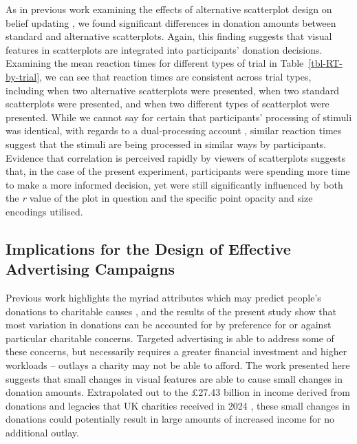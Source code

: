 \documentclass[
  authoryear,
  preprint,
  3p]{elsarticle}
\begin{document}
As in previous work examining the effects of alternative scatterplot
design on belief updating \citep{strain_2025}, we found significant
differences in donation amounts between standard and alternative
scatterplots. Again, this finding suggests that visual features in
scatterplots are integrated into participants' donation decisions.
Examining the mean reaction times for different types of trial in
Table~\ref{tbl-RT-by-trial}, we can see that reaction times are
consistent across trial types, including when two alternative
scatterplots were presented, when two standard scatterplots were
presented, and when two different types of scatterplot were presented.
While we cannot say for certain that participants' processing of stimuli
was identical, with regards to a dual-processing account
\citep{padilla_2018}, similar reaction times suggest that the stimuli
are being processed in similar ways by participants. Evidence that
correlation is perceived rapidly by viewers of scatterplots
\citep{rensink_2014} suggests that, in the case of the present
experiment, participants were spending more time to make a more informed
decision, yet were still significantly influenced by both the \emph{r}
value of the plot in question and the specific point opacity and size
encodings utilised.

\subsection{Implications for the Design of Effective Advertising
Campaigns}\label{implications-for-the-design-of-effective-advertising-campaigns}

Previous work highlights the myriad attributes which may predict
people's donations to charitable causes
\citep{neumayr_2019, bekkers_2011, breeze_2013, berman_2018, macaskill_2019},
and the results of the present study show that most variation in
donations can be accounted for by preference for or against particular
charitable concerns. Targeted advertising \citep{iyer_2005} is able to
address some of these concerns, but necessarily requires a greater
financial investment and higher workloads -- outlays a charity may not
be able to afford. The work presented here suggests that small changes
in visual features are able to cause small changes in donation amounts.
Extrapolated out to the £27.43 billion in income derived from donations
and legacies that UK charities received in 2024 \citep{gov_report},
these small changes in donations could potentially result in large
amounts of increased income for no additional outlay.
\end{document}
